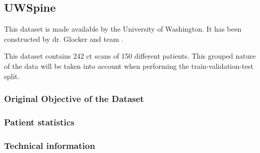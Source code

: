 \subsection{UWSpine}

This dataset is made available by the University of Washington.
It has been constructed by dr. Glocker and team \cite{Glocker2012,Glocker2013}.

This dataset contains 242 \acrshort{ct} scans of 150 different patients.
This grouped nature of the data will be taken into account when performing the train-validation-test split.

\subsubsection{Original Objective of the Dataset}

\subsubsection{Patient statistics}




\subsubsection{Technical information}
